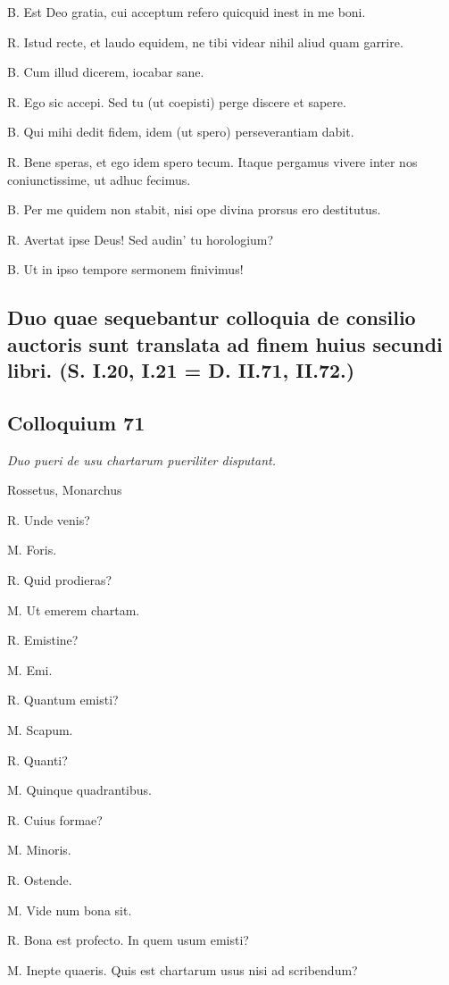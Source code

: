 \documentclass{article}
\begin{document}
B. Est Deo gratia, cui acceptum refero quicquid inest in me boni. 

R. Istud recte, et laudo equidem, ne tibi videar nihil aliud quam garrire. 

B. Cum illud dicerem, iocabar sane. 

R. Ego sic accepi. Sed tu (ut coepisti) perge discere et sapere. 

B. Qui mihi dedit fidem, idem (ut spero) perseverantiam dabit. 

R. Bene speras, et ego idem spero tecum. Itaque pergamus vivere inter nos coniunctissime, ut adhuc fecimus. 

B. Per me quidem non stabit, nisi ope divina prorsus ero destitutus. 

R. Avertat ipse Deus! Sed audin' tu horologium?

B. Ut in ipso tempore sermonem finivimus!

\subsection*{Duo quae sequebantur colloquia de consilio auctoris sunt translata ad finem huius secundi libri. (S. I.20, I.21 = D. II.71, II.72.)}

\subsection{Colloquium 71}
\emph{Duo pueri de usu chartarum pueriliter disputant.}

Rossetus, Monarchus

R. Unde venis?

M. Foris. 

R. Quid prodieras?

M. Ut emerem chartam. 

R. Emistine?

M. Emi. 

R. Quantum emisti?

M. Scapum. 

R. Quanti?

M. Quinque quadrantibus. 

R. Cuius formae?

M. Minoris. 

R. Ostende. 

M. Vide num bona sit. 

R. Bona est profecto. In quem usum emisti?

M. Inepte quaeris. Quis est chartarum usus nisi ad scribendum?
\end{document}
